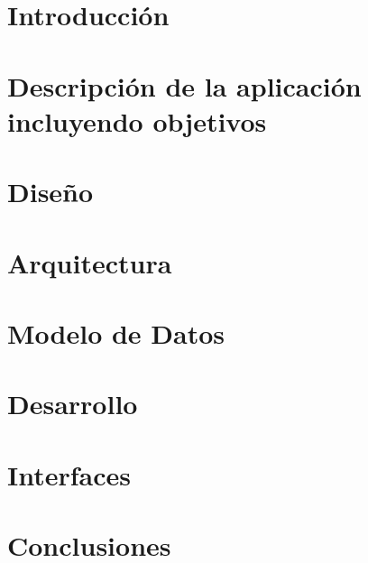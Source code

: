 \documentclass[12pt,oneside,a4paper]{report}
\begin{document}


\setcounter{page}{1}

\tableofcontents
\clearpage

\listoffigures
\clearpage

\listoftables
\clearpage

\setcounter{page}{1}

\chapter{Introducción}


\chapter{Descripción de la aplicación incluyendo objetivos}


\chapter{Diseño}


\chapter{Arquitectura}


\chapter{Modelo de Datos}


\chapter{Desarrollo}


\chapter{Interfaces}


\chapter{Conclusiones}




\end{document}
